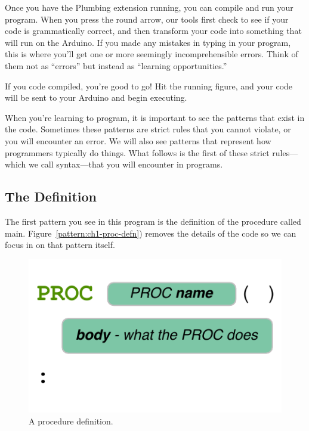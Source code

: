 Once you have the Plumbing extension running, you can compile and run your program. When you press the round arrow, our tools first check to see if your code is grammatically correct, and then transform your code into something that will run on the Arduino. If you made any mistakes in typing in your program, this is where you'll get one or more seemingly incomprehensible errors. Think of them not as ``errors'' but instead as ``learning opportunities.''
                                         
If you code compiled, you're good to go! Hit the running figure, and your code will be sent to your Arduino and begin executing.

\PATTERNS
When you're learning to program, it is important to see the patterns that exist in the code. Sometimes these patterns are strict rules that you cannot violate, or you will encounter an error. We will also see patterns that represent how programmers typically do things. What follows is the first of these strict rules---which we call {\strong syntax}---that you will encounter in \occam programs. 

\subsection{The \PROCedure Definition}
The first pattern you see in this program is the definition of the procedure called {\code main}. Figure~\vref{pattern:ch1-proc-defn}) removes the details of the code so we can focus in on that pattern itself.

\begin{figure}[h]
  \begin{center}
    \includegraphics[scale=1.0]{images/ch1-proc-defn-pattern}
    \caption{A procedure definition.}
    \label{pattern:ch1-proc-defn}
  \end{center}
\end{figure}
        
